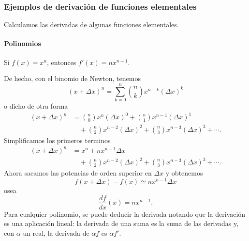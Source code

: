 \documentclass[12pt, a4paper]{article}
\theoremstyle{rioplatense}
\begin{document}
\begin{center}
\end{center}

\subsubsection{Ejemplos de derivación de funciones elementales}

Calculamos las derivadas de algunas funciones elementales.

\paragraph{Polinomios} Si $f(x) = x^n$, entonces $f'(x) = n x^{n-1}$.

De hecho, con el binomio de Newton, tenemos
\[
(x + \Delta x)^n = \sum_{k=0}^{n} \binom{n}{k} x^{n-k} (\Delta x)^k
\]
o dicho de otra forma
\begin{align*}
(x + \Delta x)^n &= \binom{n}{0} x^n (\Delta x)^0 + \binom{n}{1} x^{n-1} (\Delta x)^1 \\
&\quad + \binom{n}{2} x^{n-2} (\Delta x)^2 + \binom{n}{3} x^{n-3} (\Delta x)^3 + \cdots. %
\end{align*}
Simplificamos los primeros terminos
\begin{align*}
(x + \Delta x)^n &= x^n  + n x^{n-1} \Delta x \\
&\quad + \binom{n}{2} x^{n-2} (\Delta x)^2 + \binom{n}{3} x^{n-3} (\Delta x)^3 + \cdots. %
\end{align*}
Ahora sacamos las potencias de orden superior en $\Delta x$ y obtenemos
\[
f( x + \Delta x) - f(x) \simeq n x^{n-1} \Delta x
\]
osea 
\[
\frac{df}{dx} (x) = n x^{n-1}.
\] 
Para cualquier polinomio, se puede deducir la derivada notando que la derivaci\'on es una aplicaci\'on lineal: la derivada de una suma es la suma de las derivadas y, con $\alpha$ un real, la derivada de $\alpha f$ es $\alpha f'$.
\end{document}
